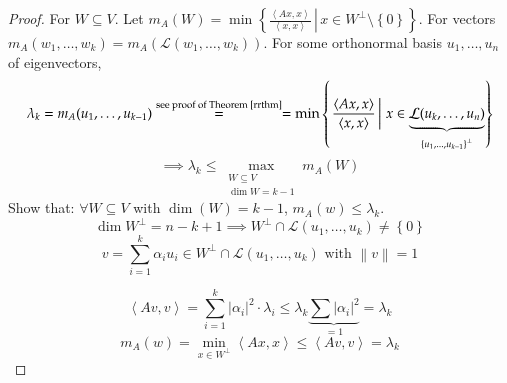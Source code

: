 \documentclass{article}
\newcommand{\set}[1]{\left\{#1\right\}}
\newcommand{\setdef}[2]{\left\{\left.#1\,\right|\,#2\right\}}
\newcommand{\angel}[1]{\left\langle#1\right\rangle}
\newcommand{\norm}[1]{\left\|#1\right\|}
\newcommand{\card}[1]{\left|#1\right|}
\begin{document}
\begin{proof}
  For $W \subseteq V$.
  Let $m_A(W) = \min\setdef{\frac{\angel{Ax, x}}{\angel{x, x}}}{x \in W^\bot \setminus \set{0}}$.
  For vectors $m_A(w_1, \dots, w_k) = m_A(\mathcal L(w_1, \dots, w_k))$.
  For some orthonormal basis $u_1, \dots, u_n$ of eigenvectors,
  \[ \lambda_k = m_A(u_1, \dots, u_{k-1}) \overset{\text{see proof of Theorem~\ref{rrthm}}}{=} = \min \setdef{\frac{\angel{Ax, x}}{\angel{x, x}}}{x \in \underbrace{\mathcal L(u_k, \dots, u_n)}_{\set{u_1, \dots, u_{k-1}}^\bot}} \]
  \[ \implies \lambda_k \leq \max_{\substack{W \subseteq V \\ \dim{W} = k - 1}} m_A(W) \]
  Show that: $\forall W \subseteq V$ with $\dim(W) = k-1$, $m_A(w) \leq \lambda_k$.
  \[ \dim{W^{\bot}} = n - k + 1 \implies W^\bot \cap \mathcal L(u_1, \dots, u_k) \neq \set{0} \]
  \[ v = \sum_{i=1}^k \alpha_i u_i \in W^\bot \cap \mathcal L(u_1, \dots, u_k) \text{ with } \norm{v} = 1 \]

  \[ \angel{Av, v} = \sum_{i=1}^k \card{\alpha_i}^2 \cdot \lambda_i \leq \lambda_k \underbrace{\sum \card{\alpha_i}^2}_{=1} = \lambda_k \]
  \[ m_A(w) = \min_{x \in W^\bot} \angel{Ax, x} \leq \angel{Av, v} = \lambda_k \]
\end{proof}


\printindex
\end{document}

